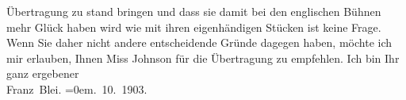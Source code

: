 \begin{ledgroupsized}[t]{13cm}
                    Übertragung zu stand bringen und dass sie damit bei den englischen Bühnen mehr Glück haben wird wie mit ihren
                    eigenhändigen Stücken ist keine Frage. Wenn Sie {\pb}daher nicht andere entscheidende
                    Gründe dagegen haben, möchte ich mir erlauben, Ihnen Miss Johnson für die Übertragung zu empfehlen.\pend
           \pstart
           Ich bin Ihr ganz ergebener{\\[\baselineskip]}\spacefill\mbox{Franz Blei.}\pend
           \leftskip=0em{}. 10. 1903.\pend
           
         
         \endnumbering{}\end{ledgroupsized}  \newcommand{\dateiname}{L01327}\newcommand{\titel}{Franz Blei an Arthur Schnitzler, 12. 10. 1903}\newcommand{\editorInnen}{Martin Anton Müller und Gerd-Hermann Susen}
      